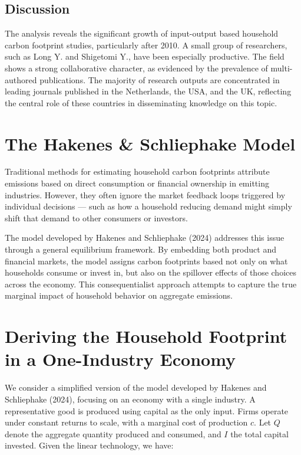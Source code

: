 \documentclass[12pt,a4paper]{article}%
\begin{document}
\subsection{Discussion}

The analysis reveals the significant growth of input-output based household carbon footprint studies, particularly after 2010. A small group of researchers, such as Long Y. and Shigetomi Y., have been especially productive. The field shows a strong collaborative character, as evidenced by the prevalence of multi-authored publications. The majority of research outputs are concentrated in leading journals published in the Netherlands, the USA, and the UK, reflecting the central role of these countries in disseminating knowledge on this topic.

\section*{The Hakenes \& Schliephake Model}

Traditional methods for estimating household carbon footprints attribute emissions based on direct consumption or financial ownership in emitting industries. However, they often ignore the market feedback loops triggered by individual decisions — such as how a household reducing demand might simply shift that demand to other consumers or investors.

The model developed by Hakenes and Schliephake (2024) addresses this issue through a general equilibrium framework. By embedding both product and financial markets, the model assigns carbon footprints based not only on what households consume or invest in, but also on the spillover effects of those choices across the economy. This consequentialist approach attempts to capture the true marginal impact of household behavior on aggregate emissions.

\section{Deriving the Household Footprint in a One-Industry Economy}

We consider a simplified version of the model developed by Hakenes and Schliephake (2024), focusing on an economy with a single industry. A representative good is produced using capital as the only input. Firms operate under constant returns to scale, with a marginal cost of production $c$. Let $Q$ denote the aggregate quantity produced and consumed, and $I$ the total capital invested. Given the linear technology, we have:
\end{document}
